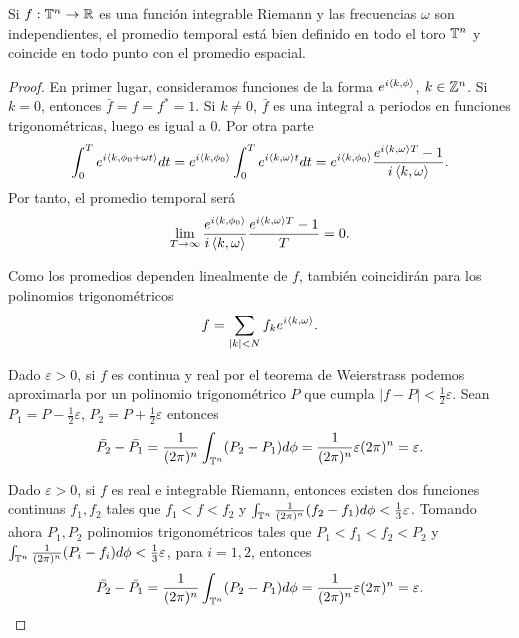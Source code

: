 \begin{thm}
  Si $f:\mathbb{T}^n \rightarrow \mathbb{R}$ es una función integrable Riemann y las frecuencias $\omega$ son independientes, el promedio temporal está bien definido en todo el toro $\mathbb{T}^n$ y coincide en todo punto con el promedio espacial.
\end{thm}
\begin{proof}
    En primer lugar, consideramos funciones de la forma $e^{i\left\langle k,\phi\right\rangle}$, $k\in \mathbb{Z}^n$. Si $k=0$, entonces $\bar{f}=f=f^*=1$. Si $k\neq0$, $\bar{f}$ es una integral a periodos en funciones trigonométricas, luego es igual a 0. Por otra parte
     \begin{equation*}
       \int_0^T e^{i\left\langle k,\phi_0 + \omega t\right\rangle} dt= e^{i\left\langle k,\phi_0\right\rangle}\int_0^T e^{i\left\langle k,\omega\right\rangle t}dt=e^{i\left\langle k,\phi_0\right\rangle}\frac{e^{i\left\langle k,\omega\right\rangle T}-1}{i \left\langle k,\omega\right\rangle}.
     \end{equation*}
     Por tanto, el promedio temporal será
     \begin{equation*}
       \lim_{T\rightarrow \infty}\frac{e^{i\left\langle k,\phi_0\right\rangle}}{i \left\langle k,\omega\right\rangle}\frac{e^{i\left\langle k,\omega\right\rangle T}-1}{T}=0.
     \end{equation*}
     
    Como los promedios dependen linealmente de $f$, también coincidirán para los polinomios trigonométricos
     \begin{equation*}
       f=\sum_{|k|<N}f_ke^{i\left\langle k,\omega\right\rangle}.
     \end{equation*}

    Dado $\varepsilon >0$, si $f$ es continua y real por el teorema de Weierstrass podemos aproximarla por un polinomio trigonométrico $P$ que cumpla $|f-P|<\frac{1}{2}\varepsilon$. Sean $P_1=P-\frac{1}{2}\varepsilon$, $P_2=P+\frac{1}{2}\varepsilon$ entonces
     \begin{equation*}
       \bar{P_2}-\bar{P_1}=\frac{1}{(2\pi)^n}\int_{\mathbb{T}^n} (P_2 - P_1) d\phi = \frac{1}{(2\pi)^n}\varepsilon (2\pi)^n= \varepsilon.
     \end{equation*}

    Dado $\varepsilon >0$, si $f$ es real e integrable Riemann, entonces existen dos funciones continuas $f_1,f_2$ tales que $f_1<f<f_2$ y $\int_{\mathbb{T}^n}\frac{1}{(2\pi)^n}(f_2-f_1)d\phi<\frac{1}{3}\varepsilon$. Tomando ahora $P_1,P_2$ polinomios trigonométricos tales que $P_1<f_1<f_2<P_2$ y $\int_{\mathbb{T}^n}\frac{1}{(2\pi)^n}(P_i-f_i)d\phi < \frac{1}{3}\varepsilon$, para $i=1,2$, entonces
     \begin{equation*}
       \bar{P_2}-\bar{P_1}=\frac{1}{(2\pi)^n}\int_{\mathbb{T}^n} (P_2 - P_1) d\phi = \frac{1}{(2\pi)^n}\varepsilon (2\pi)^n= \varepsilon.
     \end{equation*}


\end{proof}

